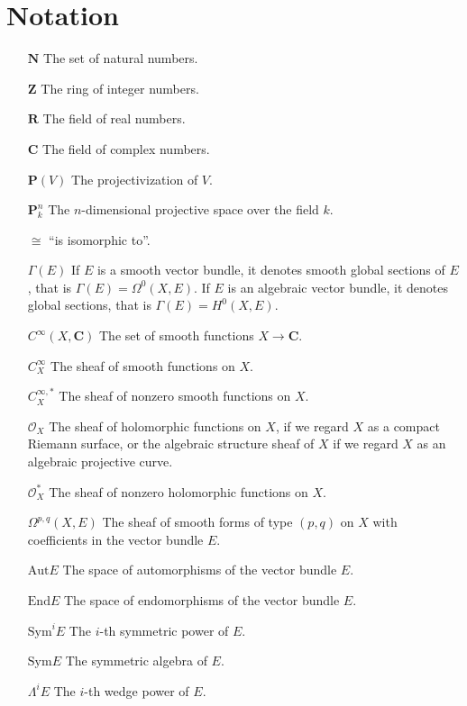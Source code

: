\documentclass[12pt,a4paper]{book}
\theoremstyle{definition} \newtheorem{defn}[thm]{Definition}
\theoremstyle{definition} \newtheorem{ejemplo}[thm]{Example}
\theoremstyle{remark} \newtheorem{rem}[thm]{Remark}
\def\OO{\mathscr{O}}
\def\CC{\mathbf{C}}
\def\ZZ{\mathbf{Z}}
\def\RR{\mathbf{R}}
\def\NN{\mathbf{N}}
\def\PP{\mathbf{P}}
\def\End{\mathrm{End}}
\def\Aut{\mathrm{Aut}}
\def\Sym{\mathrm{Sym}}
\begin{document}
\chapter*{Notation}
\begin{itemize}
  \item[$\NN$] The set of natural numbers.
  \item[$\ZZ$] The ring of integer numbers.
  \item[$\RR$] The field of real numbers.
  \item[$\CC$] The field of complex numbers.
  \item[$\PP(V)$] The projectivization of $V$.
  \item[$\PP^n_k$] The $n$-dimensional projective space over the field $k$.

  \item[$\cong$]  ``is isomorphic to''.

  \item[$\Gamma(E)$]  If $E$ is a smooth vector bundle, it denotes smooth global sections of $E$, that is $\Gamma(E)=\Omega^0(X,E)$. If $E$ is an algebraic vector bundle, it denotes global sections, that is $\Gamma(E)=H^0(X,E)$.

  \item[$C^\infty(X,\CC)$]  The set of smooth functions $X\rightarrow \CC$.

  \item[$C^\infty_X$]  The sheaf of smooth functions on $X$.

  \item[$C^{\infty,*}_X$]  The sheaf of nonzero smooth functions on $X$.

  \item[$\OO_X$] The sheaf of holomorphic functions on $X$, if we regard $X$ as a compact Riemann surface, or the algebraic structure sheaf of $X$ if we regard $X$ as an algebraic projective curve.

  \item[$\OO_X^*$] The sheaf of nonzero holomorphic functions on $X$.

  \item[$\Omega^{p,q}(X,E)$] The sheaf of smooth forms of type $(p,q)$ on $X$ with coefficients in the vector bundle $E$.

  \item[$\Aut E$] The space of automorphisms of the vector bundle $E$.

  \item[$\End E$] The space of endomorphisms of the vector bundle $E$.

  \item[$\Sym^i E$] The $i$-th symmetric power of $E$.

  \item[$\Sym E$] The symmetric algebra of $E$.

  \item[$ \Lambda^i E$] The $i$-th wedge power of $E$.

\end{itemize}
\end{document}
